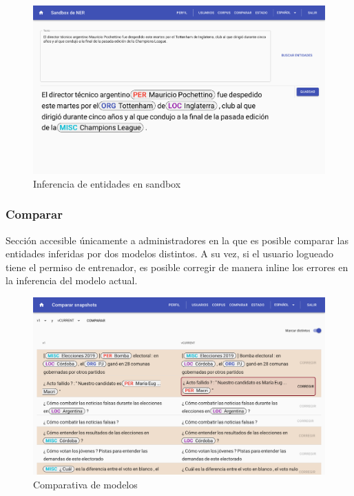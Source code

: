 \documentclass[12pt,a4paper,]{scrartcl}
\begin{document}
\begin{figure}[H]

{\centering \includegraphics{assets/logic/sandbox.pdf} 

}

\caption{Inferencia de entidades en sandbox}\label{fig:logic-sandbox}
\end{figure}

\hypertarget{comparar}{%
\subsubsection{Comparar}\label{comparar}}

Sección accesible únicamente a administradores en la que es posible comparar las entidades inferidas por dos modelos distintos. A su vez, si el usuario logueado tiene el permiso de entrenador, es posible corregir de manera inline los errores en la inferencia del modelo actual.

\begin{figure}[H]

{\centering \includegraphics{assets/logic/compare.pdf} 

}

\caption{Comparativa de modelos}\label{fig:logic-compare}
\end{figure}
\end{document}
